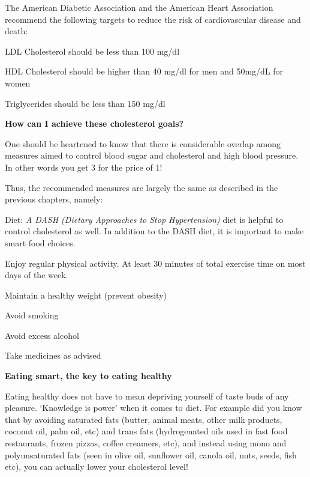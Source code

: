 The American Diabetic Association and the American Heart Association recommend the following targets to reduce the risk of cardiovascular disease and death:

\item LDL Cholesterol should be less than 100 mg/dl

 \item HDL Cholesterol should be higher than 40 mg/dl for men and 50mg/dL for women

 \item Triglycerides should be less than 150 mg/dl

\textbf{How can I achieve these cholesterol goals?}

One should be heartened to know that there is considerable overlap among measures aimed to control blood sugar and cholesterol and high blood pressure. In other words you get 3 for the price of 1!

Thus, the recommended measures are largely the same as described in the previous chapters, namely:

\item Diet: \textit{A DASH (Dietary Approaches to Stop Hypertension)} diet is helpful to control cholesterol as well. In addition to the DASH diet, it is important to make smart food choices.

 \item Enjoy regular physical activity. At least 30 minutes of total exercise time on most days of the week.

 \item Maintain a healthy weight (prevent obesity)

 \item Avoid smoking

 \item Avoid excess alcohol

 \item Take medicines as advised

\textbf{Eating smart, the key to eating healthy}

Eating healthy does not have to mean depriving yourself of taste buds of any pleasure. ‘Knowledge is power’ when it comes to diet. For example did you know that by avoiding saturated fats (butter, animal meats, other milk products, coconut oil, palm oil, etc) and trans fats (hydrogenated oils used in fast food restaurants, frozen pizzas, coffee creamers, etc), and instead using mono and polyunsaturated fats (seen in olive oil, sunflower oil, canola oil, nuts, seeds, fish etc), you can actually lower your cholesterol level!

